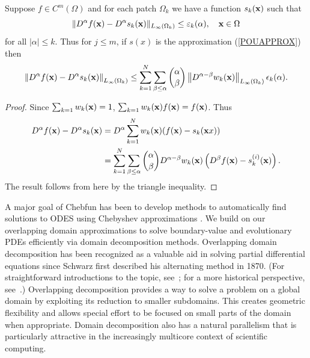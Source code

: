 \begin{thm}
	\label{PUMCON}
	Suppose $f \in C^{m}(\Omega)$ and for each patch $\Omega_k$ we have a function $s_k(\mathbf{x})$ such that
	$$ \|D^{\alpha}f(\mathbf{x})-D^{\alpha} s_k(\mathbf{x})\|_{L_{\infty}(\Omega_k)} \leq \varepsilon_k(\alpha),\quad \mathbf{x} \in \Omega $$
	for all $|\alpha| \leq k$. Thus for $j\leq m$, if $s(x)$ is the approximation (\ref{POUAPPROX}) then
	\begin{equation}
	\left \| D^{\alpha}f(\mathbf{x})-D^{\alpha} s_k(\mathbf{x}) \right \|_{L_{\infty}(\Omega_k)} \leq \sum_{k=1}^N\sum_{\beta \leq \alpha} \binom{\alpha}{\beta} \left \| D^{\alpha-\beta} w_k(\mathbf{x}) \right \|_{L_{\infty}(\Omega_k)} \epsilon_k(\alpha).
	\end{equation}
\end{thm}
\begin{proof}
	Since $\sum_{k=1} w_k(\mathbf{x})=1$, $\sum_{k=1} w_k(\mathbf{x})f(\mathbf{x})=f(\mathbf{x})$. Thus
	\begin{equation}
	\begin{aligned}
	D^{\alpha}f(\mathbf{x})-D^{\alpha} s_k(\mathbf{x}) &= D^{\alpha} \sum_{k=1}^N w_k(\mathbf{x})(f(\mathbf{x})-s_k(\mathbf{x}x)) \\
	&= \sum_{k=1}^N\sum_{\beta \leq \alpha} \binom{\alpha}{\beta} D^{\alpha-\beta} w_k(\mathbf{x}) \left( D^{\beta} f(\mathbf{x})-s_k^{(i)}(\mathbf{x}) \right).
	\end{aligned}
	\end{equation}
	The result follows from here by the triangle inequality.
\end{proof}

A major goal of Chebfun has been to develop methods to automatically find solutions to ODES using Chebyshev approximations \cite{driscoll2008chebop,birkisson2012automatic,birkisson2013numerical}. We build on our overlapping domain approximations to solve boundary-value and evolutionary PDEs efficiently via domain decomposition methods. Overlapping domain decomposition has been recognized as a valuable aid in solving partial differential equations since Schwarz first described his alternating method in 1870. (For straightforward introductions to the topic, see~\cite{Dolean2015,Smith2004}; for a more historical perspective, see~\cite{Gander2008}.) Overlapping decomposition provides a way to solve a problem on a global domain by exploiting its reduction to smaller subdomains. This creates geometric flexibility and allows special effort to be focused on small parts of the domain when appropriate. Domain decomposition also has a natural parallelism that is particularly attractive in the increasingly multicore context of scientific computing.

